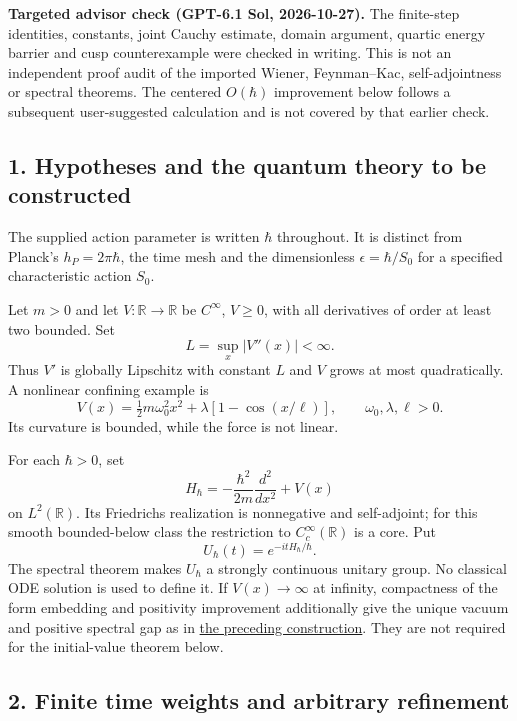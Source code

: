 \documentclass[11pt,a4paper]{article}
\begin{document}
\textbf{Targeted advisor check (GPT-6.1 Sol, 2026-10-27).} The
finite-step identities, constants, joint Cauchy estimate, domain
argument, quartic energy barrier and cusp counterexample were checked in
writing. This is not an independent proof audit of the imported Wiener,
Feynman--Kac, self-adjointness or spectral theorems. The centered
\(O(\hbar)\) improvement below follows a subsequent user-suggested
calculation and is not covered by that earlier check.

\hypertarget{hypotheses-and-the-quantum-theory-to-be-constructed}{%
\subsection{1. Hypotheses and the quantum theory to be
constructed}\label{hypotheses-and-the-quantum-theory-to-be-constructed}}

The supplied action parameter is written \(\hbar\) throughout. It is
distinct from Planck's \(h_P=2\pi\hbar\), the time mesh and the
dimensionless \(\epsilon=\hbar/S_0\) for a specified characteristic
action \(S_0\).

Let \(m>0\) and let \(V:\mathbb R\to\mathbb R\) be \(C^\infty\),
\(V\ge0\), with all derivatives of order at least two bounded. Set
\[L=\sup_x|V''(x)|<\infty.\tag{1}\] Thus \(V'\) is globally Lipschitz
with constant \(L\) and \(V\) grows at most quadratically. A nonlinear
confining example is
\[V(x)=\tfrac12m\omega_0^2x^2+\lambda[1-\cos(x/\ell)],
\qquad\omega_0,\lambda,\ell>0.\tag{2}\] Its curvature is bounded, while
the force is not linear.

For each \(\hbar>0\), set
\[H_\hbar=-\frac{\hbar^2}{2m}\frac{d^2}{dx^2}+V(x)\tag{3}\] on
\(L^2(\mathbb R)\). Its Friedrichs realization is nonnegative and
self-adjoint; for this smooth bounded-below class the restriction to
\(C_c^\infty(\mathbb R)\) is a core. Put
\[U_\hbar(t)=e^{-itH_\hbar/\hbar}.\tag{4}\] The spectral theorem makes
\(U_\hbar\) a strongly continuous unitary group. No classical ODE
solution is used to define it. If \(V(x)\to\infty\) at infinity,
compactness of the form embedding and positivity improvement
additionally give the unique vacuum and positive spectral gap as in
\href{constructive-qft-one-time.md}{the preceding construction}. They
are not required for the initial-value theorem below.

\hypertarget{finite-time-weights-and-arbitrary-refinement}{%
\subsection{2. Finite time weights and arbitrary
refinement}\label{finite-time-weights-and-arbitrary-refinement}}
\end{document}
